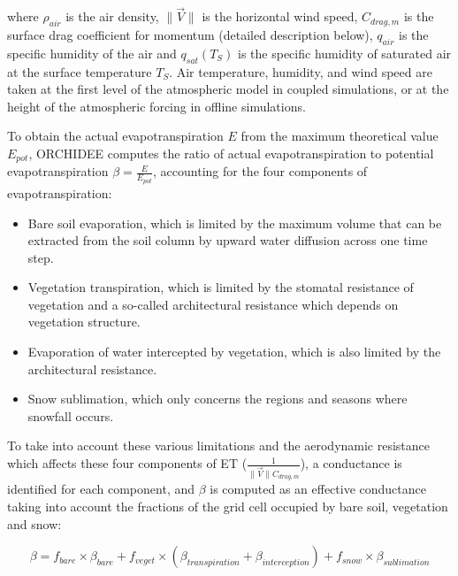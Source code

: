 where $\rho_{air}$ is the air density, $\lVert \vec{V} \rVert$ is the horizontal wind speed, $C_{drag, m}$ is the surface drag coefficient for momentum (detailed description below), $q_{air}$ is the specific humidity of the air and $q_{sat}(T_S)$ is the specific humidity of saturated air at the surface temperature $T_S$. Air temperature, humidity, and wind speed are taken at the first level of the atmospheric model in coupled simulations, or at the height of the atmospheric forcing in offline simulations.

To obtain the actual evapotranspiration $E$ from the maximum theoretical value $E_{pot}$, ORCHIDEE computes the ratio of actual evapotranspiration to potential evapotranspiration $\beta = \frac{E}{E_{pot}}$, accounting for the four components of evapotranspiration:  

\begin{itemize}
    \item Bare soil evaporation, which is limited by the maximum volume that can be extracted from the soil column by upward water diffusion across one time step.
    \item Vegetation transpiration, which is limited by the stomatal resistance of vegetation and a so-called architectural resistance which depends on vegetation structure.
    \item Evaporation of water intercepted by vegetation, which is also limited by the architectural resistance.
    \item Snow sublimation, which only concerns the regions and seasons where snowfall occurs.
\end{itemize}

To take into account these various limitations and the aerodynamic resistance which affects these four components of ET ($\frac{1}{\lVert \vec{V} \rVert C_{drag, m}}$), a conductance is identified for each component, and $\beta$ is computed as an effective conductance taking into account the fractions of the grid cell occupied by bare soil, vegetation and snow:

\begin{equation}
    \beta = f_{bare} \times \beta_{bare} + f_{veget} \times ( \beta_{transpiration} + \beta_{interception} ) + f_{snow} \times  \beta_{sublimation}
\end{equation}

